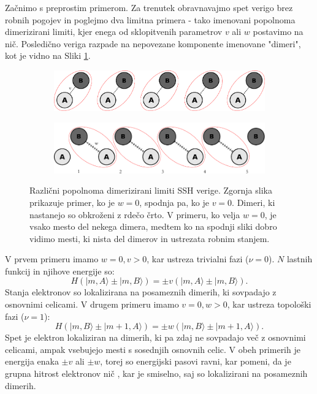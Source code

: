 Začnimo s preprostim primerom. Za trenutek obravnavajmo spet verigo brez robnih pogojev in poglejmo dva limitna primera - tako imenovani popolnoma dimerizirani limiti, kjer enega od sklopitvenih parametrov $v$ ali $w$ postavimo na nič. Posledično veriga razpade na nepovezane komponente imenovane "dimeri", kot je vidno na Sliki \ref{fig:dimerized}.

\begin{figure}[H]
\centering
\begin{subfigure}{.9\textwidth}
\includegraphics[width=\linewidth]{Figures/MyDimerized1.pdf}
\end{subfigure}
\begin{subfigure}{.9\textwidth}
\includegraphics[width=\linewidth]{Figures/MyDimerized2.pdf}
\end{subfigure}
\caption{Različni popolnoma dimerizirani limiti SSH verige. Zgornja slika prikazuje primer, ko je $w=0$, spodnja pa, ko je $v=0$. Dimeri, ki nastanejo so obkroženi z rdečo črto. V primeru, ko velja $w=0$, je vsako mesto del nekega dimera, medtem ko na spodnji sliki dobro vidimo mesti, ki nista del dimerov in ustrezata robnim stanjem.}
\label{fig:dimerized}
\end{figure}

V prvem primeru imamo $w=0, v > 0$, kar ustreza trivialni fazi ($\nu=0$). $N$ lastnih funkcij in njihove energije so:
\begin{equation}
H ( |m, A \rangle \pm | m , B \rangle) = \pm v( |m, A \rangle \pm | m, B \rangle ).
\end{equation}
Stanja elektronov so lokalizirana na posameznih dimerih, ki sovpadajo z osnovnimi celicami.
V drugem primeru imamo $v=0, w>0$, kar ustreza topološki fazi ($\nu = 1$):
\begin{equation}
H ( |m, B \rangle \pm | m + 1 , A \rangle) = \pm w( |m, B \rangle \pm | m+1,A \rangle ).
\end{equation}
Spet je elektron lokaliziran na dimerih, ki pa zdaj ne sovpadajo več z osnovnimi celicami, ampak vsebujejo mesti s sosednjih osnovnih celic.
V obeh primerih je energija enaka $\pm v$ ali $\pm w$, torej so energijski pasovi ravni, kar pomeni, da je grupna hitrost elektronov nič \cite{ashcroft}, kar je smiselno, saj so lokalizirani na posameznih dimerih.

